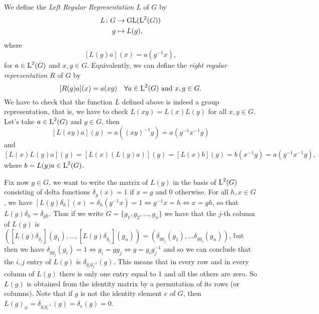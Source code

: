\begin{exmp}
\label{exa:lrr}
We define the \emph{Left Regular Representation} $L$ of $G$ by 
\begin{align*}
L\colon G &\rightarrow \operatorname{GL}(\operatorname{L}^2(G))\\
	 g&\mapsto L(g),
\end{align*}
where 
\[
[L(g)a](x)=a(g^{-1}x),
\]
for $a \in \operatorname{L}^2(G)$ and $x,g \in G$.
Equivalently, we can define the \emph{right regular representation} $R$ of $G$ by
\[
[R(g)a](x)=a(xg)\quad \forall a \in \operatorname{L}^2(G)\text{ and $x,g\in G$}.
\] 
We have to check that the function $L$ defined above is indeed a group representation, that is, we have to check $L(xy)=L(x)L(y)$ for all $x,y \in G$. Let's take $a \in \operatorname{L}^2(G)$ and $g\in G$, then
\[ [L(xy)a](g)=a((xy)^{-1}g)=a(y^{-1}x^{-1}g)
\]
and
\[
[L(x) L(y)a](g)=[L(x)(L(y)a)](g)=[L(x)b](g)=b(x^{-1}g)=a(y^{-1}x^{-1}g),
\]
where $b=L(y)a \in \operatorname{L}^2(G)$.

Fix now $g\in G$, we want to write the matrix of $L(g)$ in the basis of $\operatorname{L}^2(G)$ consisting of delta functions $\delta_g(x)=1$ if $x=g$ and 0 otherwise. For all $h,x\in G$, we have $[L(g)\delta_h](x)=\delta_h(g^{-1}x)=1 \iff g^{-1}x=h \iff x=gh$, so that $L(g)\delta_h=\delta_{gh}$. Thus if we write $G=\{g_1,g_2,\dots , g_n\}$ we have that the $j$-th column of $L(g)$ is $([L(g)\delta_{g_j}](g_1),\dots , [L(g)\delta_{g_j}](g_n))=(\delta_{gg_j}(g_1),\dots \delta_{gg_j}(g_n))$, but then we have $\delta_{gg_j}(g_i)=1\iff g_i=gg_j\iff g=g_ig_j^{-1}$ and so we can conclude that the $i,j$ entry of $L(g)$ is $\delta_{g_ig_j^{-1}}(g)$. This means that in every row and in every column of $L(g)$ there is only one entry equal to 1 and all the others are zero. So $L(g)$ is obtained from the identity matrix by a permutation of its rows (or columns). Note that if $g$ is not the identity element $e$ of $G$, then $L(g)_{ii}=\delta_{g_ig_i^{-1}}(g)=\delta_{e}(g)=0$.
\end{exmp}

